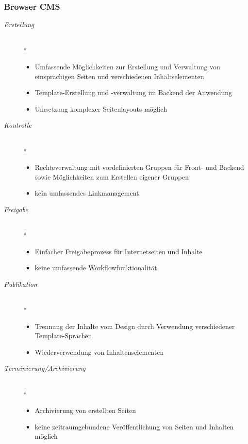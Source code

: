 \newpage
\subsubsection{Browser CMS}

\begin{description}
\item[\emph{Erstellung}]\mbox{~}\\*
\begin{itemize}
	\item Umfassende Möglichkeiten zur Erstellung und Verwaltung von einsprachigen Seiten und verschiedenen Inhaltselementen
	\item Template-Erstellung und -verwaltung im Backend der Anwendung
	\item Umsetzung komplexer Seitenlayouts möglich
\end{itemize}
\item[\emph{Kontrolle}]\mbox{~}\\*
\begin{itemize}
	\item Rechteverwaltung mit vordefinierten Gruppen für Front- und Backend sowie Möglichkeiten zum Erstellen eigener Gruppen
	\item kein umfassendes Linkmanagement
\end{itemize}
\item[\emph{Freigabe}]\mbox{~}\\*
\begin{itemize}
	\item Einfacher Freigabeprozess für Internetseiten und Inhalte
	\item keine umfassende Workflowfunktionalität
\end{itemize}
\item[\emph{Publikation}]\mbox{~}\\*
\begin{itemize}
	\item Trennung der Inhalte vom Design durch Verwendung verschiedener Template-Sprachen
	\item Wiederverwendung von Inhaltenselementen
\end{itemize}
\item[\emph{Terminierung/Archivierung}]\mbox{~}\\*
\begin{itemize}
	\item Archivierung von erstellten Seiten
	\item keine zeitraumgebundene Veröffentlichung von Seiten und Inhalten möglich
\end{itemize}
\end{description}


